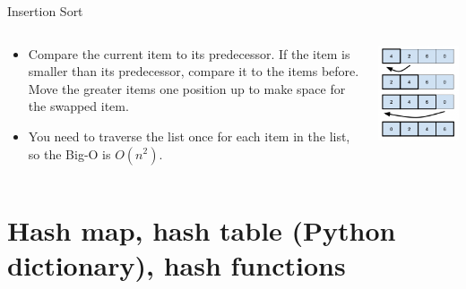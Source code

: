\documentclass[
  ignorenonframetext,
]{beamer}
\begin{document}
\begin{frame}{Insertion Sort}
\protect\hypertarget{insertion-sort}{}
\begin{columns}[T]
\begin{column}{0.6\textwidth}
\begin{itemize}
\item
  Compare the current item to its predecessor. If the item is smaller
  than its predecessor, compare it to the items before. Move the greater
  items one position up to make space for the swapped item.
\item
  You need to traverse the list once for each item in the list, so the
  Big-O is \(O(n^2)\).
\end{itemize}
\end{column}

\begin{column}{0.4\textwidth}
\includegraphics{images/insertion-sort.png}
\end{column}
\end{columns}
\end{frame}

\hypertarget{hash-map-hash-table-python-dictionary-hash-functions}{%
\section{Hash map, hash table (Python dictionary), hash
functions}\label{hash-map-hash-table-python-dictionary-hash-functions}}
\end{document}
